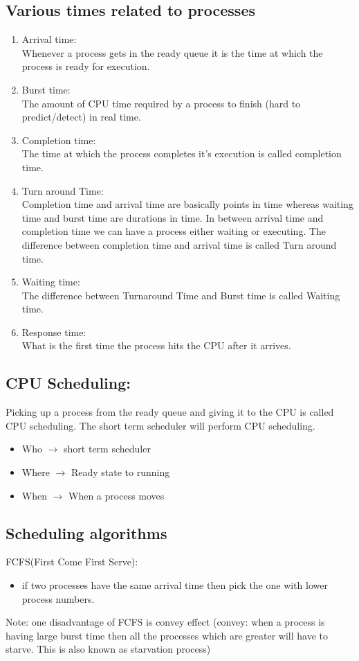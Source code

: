 \documentclass[12pt,letterpaper]{article}
\begin{document}
\subsection{Various times related to processes}
\begin{enumerate}
  \item Arrival time: \\ Whenever a process gets in the ready queue it is the time at which the process is ready for execution.
  \item Burst time: \\ The amount of CPU time required by a process to finish (hard to predict/detect) in real time. 
  \item Completion time: \\ The time at which the process completes it's execution is called completion time.
  \item Turn around Time: \\ Completion time and arrival time are basically points in time whereas waiting time and burst time are durations in time. In between arrival time and completion time we can have a process 
    either waiting or executing. The difference between completion time and arrival time is called Turn around time.
  \item Waiting time: \\ The difference between Turnaround Time and Burst time is called Waiting time. 
  \item Response time: \\ What is the first time the process hits the CPU after it arrives. 
\end{enumerate}

\subsection{CPU Scheduling:}
Picking up a process from the ready queue and giving it to the CPU is called CPU scheduling. The short term scheduler will perform CPU scheduling. 
\begin{itemize}
  \item Who $\rightarrow$ short term scheduler 
  \item Where $\rightarrow$ Ready state to running 
  \item When $\rightarrow$ When a process moves
\end{itemize}

\subsection{Scheduling algorithms}
FCFS(First Come First Serve): 
\begin{itemize}
  \item if two processes have the same arrival time then pick the one with lower process numbers. 
\end{itemize}
Note: one disadvantage of FCFS is convey effect (convey: when a process is having large burst time then all the processes which are greater will have to starve. This is also known as starvation process)
\end{document}

